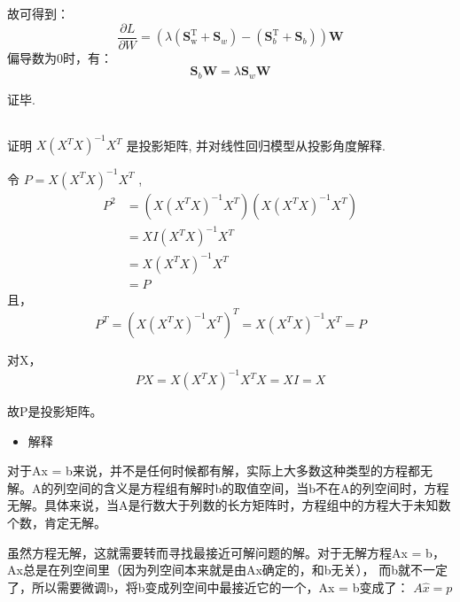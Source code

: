\documentclass[UTF8,a4paper,AutoFakeBold,AutoFakeSlant]{article}
\begin{document}
故可得到：
\begin{equation*}
  \frac{\partial L}{\partial W}=\left(\lambda\left(\boldsymbol{S}_{\mathrm{w}}^{\mathrm{T}}+\boldsymbol{S}_{w}\right)-\left(\boldsymbol{S}_{b}^{\mathrm{T}}+\boldsymbol{S}_{b}\right)\right) \boldsymbol{W}
\end{equation*}
偏导数为0时，有：
\begin{equation*}
  \boldsymbol{S}_{b} \boldsymbol{W}=\lambda \boldsymbol{S}_{w} \boldsymbol{W}
\end{equation*}

证毕.



\subsection{}
证明 $X(X^T X)^{-1} X^{T} $ 是投影矩阵, 并对线性回归模型从投影角度解释.

令 $P = X(X^T X)^{-1} X^{T}$ ,
\begin{equation*}
  \begin{aligned}
    P^2 & = (X(X^T X)^{-1} X^{T})(X(X^T X)^{-1} X^{T}) \\
        & = XI(X^T X)^{-1} X^{T}                       \\
        & = X(X^T X)^{-1} X^{T}                        \\
        & = P
  \end{aligned}
\end{equation*}
且，
\begin{equation*}
  P^T = (X(X^T X)^{-1} X^{T})^T = X(X^T X)^{-1} X^{T} = P
\end{equation*}

对X，
\begin{equation*}
  PX = X(X^T X)^{-1} X^{T}X = XI = X
\end{equation*}

故P是投影矩阵。

\begin{itemize}
  \item 解释
\end{itemize}
对于Ax = b来说，并不是任何时候都有解，实际上大多数这种类型的方程都无解。A的列空间的含义是方程组有解时b的取值空间，当b不在A的列空间时，方程无解。具体来说，当A是行数大于列数的长方矩阵时，方程组中的方程大于未知数个数，肯定无解。

虽然方程无解，这就需要转而寻找最接近可解问题的解。对于无解方程Ax = b，Ax总是在列空间里（因为列空间本来就是由Ax确定的，和b无关），
而b就不一定了，所以需要微调b，将b变成列空间中最接近它的一个，Ax = b变成了：
$A\hat{x}=p$
\end{document}
